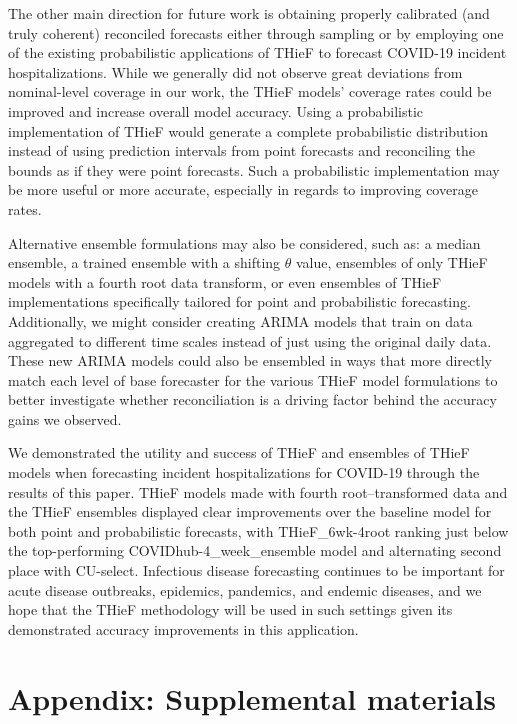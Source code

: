 \documentclass[12pt]{article}
\begin{document}
The other main direction for future work is obtaining properly calibrated (and truly coherent) reconciled forecasts either through sampling or by employing one of the existing probabilistic applications of THieF to forecast COVID-19 incident hospitalizations. While we generally did not observe great deviations from nominal-level coverage in our work, the THieF models' coverage rates could be improved and increase overall model accuracy. Using a probabilistic implementation of THieF would generate a complete probabilistic distribution instead of using prediction intervals from point forecasts and reconciling the bounds as if they were point forecasts. Such a probabilistic implementation may be more useful or more accurate, especially in regards to improving coverage rates.

Alternative ensemble formulations may also be considered, such as: a median ensemble, a trained ensemble with a shifting $\theta$ value, ensembles of only THieF models with a fourth root data transform, or even ensembles of THieF implementations specifically tailored for point and probabilistic forecasting. Additionally, we might consider creating ARIMA models that train on data aggregated to different time scales instead of just using the original daily data. These new ARIMA models could also be ensembled in ways that more directly match each level of base forecaster for the various THieF model formulations to better investigate whether reconciliation is a driving factor behind the accuracy gains we observed.

We demonstrated the utility and success of THieF and ensembles of THieF models when forecasting incident hospitalizations for COVID-19 through the results of this paper. THieF models made with fourth root--transformed data and the THieF ensembles displayed clear improvements over the baseline model for both point and probabilistic forecasts, with THieF\_6wk-4root ranking just below the top-performing COVIDhub-4\_week\_ensemble model and alternating second place with CU-select. Infectious disease forecasting continues to be important for acute disease outbreaks, epidemics, pandemics, and endemic diseases, and we hope that the THieF methodology will be used in such settings given its demonstrated accuracy improvements in this application.



\newpage

\appendix
\section{Appendix: Supplemental materials} \label{supplemental}
\end{document}
